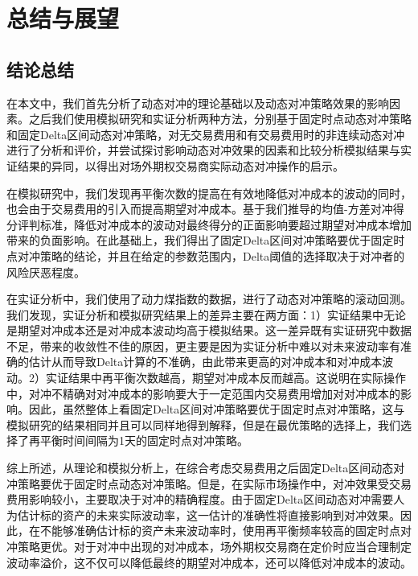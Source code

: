 
\chapter{总结与展望}
\label{chap:summary}

\section{结论总结}

在本文中，我们首先分析了动态对冲的理论基础以及动态对冲策略效果的影响因素。之后我们使用模拟研究和实证分析两种方法，分别基于固定时点动态对冲策略和固定Delta区间动态对冲策略，对无交易费用和有交易费用时的非连续动态对冲进行了分析和评价，并尝试探讨影响动态对冲效果的因素和比较分析模拟结果与实证结果的异同，以得出对场外期权交易商实际动态对冲操作的启示。

在模拟研究中，我们发现再平衡次数的提高在有效地降低对冲成本的波动的同时，也会由于交易费用的引入而提高期望对冲成本。基于我们推导的均值-方差对冲得分评判标准，降低对冲成本的波动对最终得分的正面影响要超过期望对冲成本增加带来的负面影响。在此基础上，我们得出了固定Delta区间对冲策略要优于固定时点对冲策略的结论，并且在给定的参数范围内，Delta阈值的选择取决于对冲者的风险厌恶程度。

在实证分析中，我们使用了动力煤指数的数据，进行了动态对冲策略的滚动回测。我们发现，实证分析和模拟研究结果上的差异主要在两方面：1）实证结果中无论是期望对冲成本还是对冲成本波动均高于模拟结果。这一差异既有实证研究中数据不足，带来的收敛性不佳的原因，更主要是因为实证分析中难以对未来波动率有准确的估计从而导致Delta计算的不准确，由此带来更高的对冲成本和对冲成本波动。2）实证结果中再平衡次数越高，期望对冲成本反而越高。这说明在实际操作中，对冲不精确对对冲成本的影响要大于一定范围内交易费用增加对对冲成本的影响。因此，虽然整体上看固定Delta区间对冲策略要优于固定时点对冲策略，这与模拟研究的结果相同并且可以同样地得到解释，但是在最优策略的选择上，我们选择了再平衡时间间隔为1天的固定时点对冲策略。

综上所述，从理论和模拟分析上，在综合考虑交易费用之后固定Delta区间动态对冲策略要优于固定时点动态对冲策略。但是，在实际市场操作中，对冲效果受交易费用影响较小，主要取决于对冲的精确程度。由于固定Delta区间动态对冲需要人为估计标的资产的未来实际波动率，这一估计的准确性将直接影响到对冲效果。因此，在不能够准确估计标的资产未来波动率时，使用再平衡频率较高的固定时点对冲策略更优。对于对冲中出现的对冲成本，场外期权交易商在定价时应当合理制定波动率溢价，这不仅可以降低最终的期望对冲成本，还可以降低对冲成本的波动。
